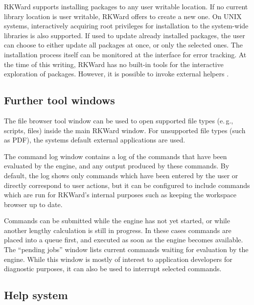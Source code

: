 RKWard supports installing packages to any user writable location. If no current
library location is user writable, RKWard offers to create a new one. 
On UNIX systems, interactively acquiring root privileges for
installation to the system-wide libraries is also supported. If used to
update already installed packages, the user can choose to either
update all packages at once, or only the selected ones. The installation process
itself can be monitored at the interface for error tracking. At the time of this writing, RKWard has no
built-in tools for the interactive exploration of  packages. However, it is
possible to invoke external helpers \citep{Zhang2004}.

\subsection{Further tool windows}
\label{sec:further_tool_windows}

The file browser tool window can be
used to open supported file types (e.\,g., 
scripts,  files) inside the main RKWard
window. For unsupported file types (such as PDF), the
systems default external applications are used.

The command log window contains a log of the commands that have been
evaluated by the  engine, and any output
produced by these commands. By default, the log shows only commands
which have been entered by the user or directly correspond to user
actions, but it can be configured to include commands which are run for
RKWard's internal purposes such as keeping the workspace browser up
to date.

Commands can be submitted while the  engine
has not yet started, or while another lengthy calculation is still
in progress. In these cases commands are placed into a queue first, and
executed as soon as the  engine becomes
available. The ``pending jobs'' window lists current  commands waiting for
evaluation by the  engine. While this
window is mostly of interest to application developers for diagnostic
purposes, it can also be used to interrupt selected commands.

\subsection{Help system}
\label{sec:help_system}


